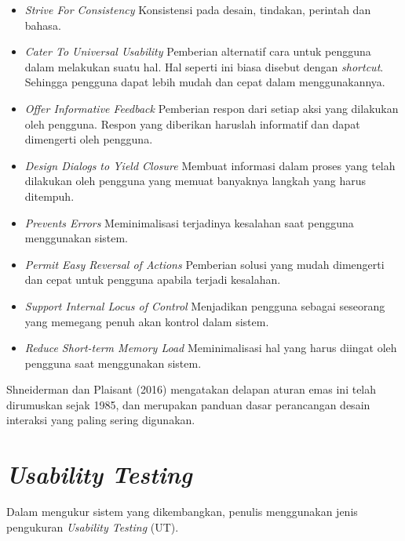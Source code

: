 \begin{itemize}
	\item \textit{Strive For Consistency}
	\subitem Konsistensi pada desain, tindakan, perintah dan bahasa.
	\item \textit{Cater To Universal Usability}
	\subitem Pemberian alternatif cara untuk pengguna dalam melakukan suatu hal. Hal seperti ini biasa disebut dengan \textit{shortcut}. Sehingga pengguna dapat lebih mudah dan cepat dalam menggunakannya.
	\item \textit{Offer Informative Feedback}
	\subitem Pemberian respon dari setiap aksi yang dilakukan oleh pengguna. Respon yang diberikan haruslah informatif dan dapat dimengerti oleh pengguna.
	\item \textit{Design Dialogs to Yield Closure}
	\subitem Membuat informasi dalam proses yang telah dilakukan oleh pengguna yang memuat banyaknya langkah yang harus ditempuh.
	\item \textit{Prevents Errors}
	\subitem Meminimalisasi terjadinya kesalahan saat pengguna menggunakan sistem.
	\item \textit{Permit Easy Reversal of Actions}
	\subitem Pemberian solusi yang mudah dimengerti dan cepat untuk pengguna apabila terjadi kesalahan.
	\item \textit{Support Internal Locus of Control}
	\subitem Menjadikan pengguna sebagai seseorang yang memegang penuh akan kontrol dalam sistem.
	\item \textit{Reduce Short-term Memory Load}
	\subitem Meminimalisasi hal yang harus diingat oleh pengguna saat menggunakan sistem.
\end{itemize}

Shneiderman dan Plaisant (2016) mengatakan delapan aturan emas ini telah dirumuskan sejak 1985, dan merupakan panduan dasar perancangan desain interaksi yang paling sering digunakan.
	
\section{\textit{Usability Testing}}

Dalam mengukur sistem yang dikembangkan, penulis menggunakan jenis pengukuran \textit{Usability Testing} (UT).
